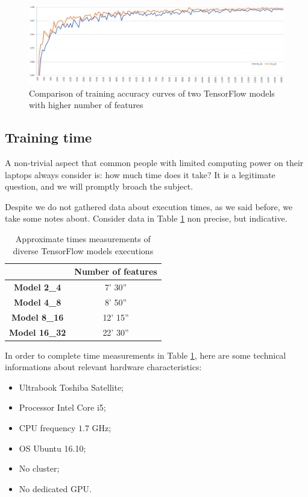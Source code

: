 \begin{landscape}
\begin{figure}
	\centering
	\includegraphics[width=1\textheight]{Images/cfr_8_16_vs_16_32}
	\caption{Comparison of training accuracy curves of two TensorFlow models with higher number of features}
	\label{fig:cfr_high}
\end{figure}
\end{landscape}

\subsection{Training time}

A non-trivial aspect that common people with limited computing power on their laptops always consider is: how much time does it take? It is a legitimate question, and we will promptly broach the subject.

Despite we do not gathered data about execution times, as we said before, we take some notes about. Consider data in Table \ref{tab:approx_times} non precise, but indicative.

\begin{table}
	\centering
	\begin{tabular}{cc}
		\hline 
		& \textbf{Number of features} \\ 
		\hline 
		\textbf{Model 2\_4} & 7' 30'' \\ 
		\textbf{Model 4\_8} & 8' 50'' \\ 
		\textbf{Model 8\_16} & 12' 15'' \\ 
		\textbf{Model 16\_32} & 22' 30'' \\ 
		\hline 
	\end{tabular}
	\caption{Approximate times measurements of diverse TensorFlow models executions}
	\label{tab:approx_times}
\end{table}

In order to complete time measurements in Table \ref{tab:approx_times}, here are some technical informations about relevant hardware characteristics:
\begin{itemize}
	\item Ultrabook Toshiba Satellite;
	\item Processor Intel Core i5;
	\item CPU frequency $1.7$ GHz;
	\item OS Ubuntu 16.10;
	\item No cluster;
	\item No dedicated GPU.
\end{itemize}

